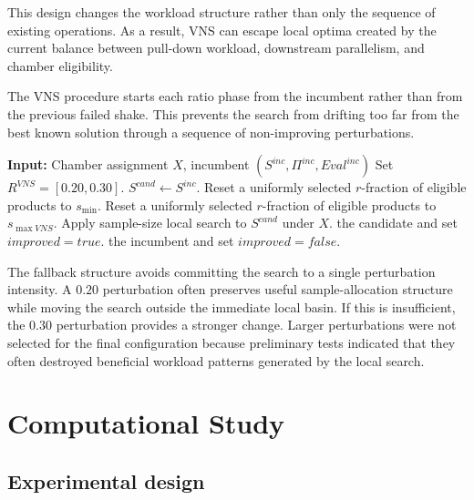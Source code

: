 \documentclass[11pt]{article}
\begin{document}
This design changes the workload structure rather than only the sequence of existing operations. As a result, VNS can escape local optima created by the current balance between pull-down workload, downstream parallelism, and chamber eligibility.

The VNS procedure starts each ratio phase from the incumbent rather than from the previous failed shake. This prevents the search from drifting too far from the best known solution through a sequence of non-improving perturbations.

\begin{algorithm}[H]
\caption{VNS with fixed fallback ratios}
\label{alg:vns_short}
\begin{algorithmic}[1]
\State \textbf{Input:} Chamber assignment \(X\), incumbent \((S^{inc},\Pi^{inc},Eval^{inc})\)
\State Set \(R^{VNS}=[0.20,0.30]\).
        \State \(S^{cand}\leftarrow S^{inc}\).
            \State Reset a uniformly selected \(r\)-fraction of eligible products to \(s_{\min}\).
        \Else
            \State Reset a uniformly selected \(r\)-fraction of eligible products to \(s_{\max VNS}\).
        \EndIf
        \State Apply sample-size local search to \(S^{cand}\) under \(X\).
            \State \Return the candidate and set \(improved=true\).
        \EndIf
    \EndFor
\EndFor
\State \Return the incumbent and set \(improved=false\).
\end{algorithmic}
\end{algorithm}

The fallback structure avoids committing the search to a single perturbation intensity. A \(0.20\) perturbation often preserves useful sample-allocation structure while moving the search outside the immediate local basin. If this is insufficient, the \(0.30\) perturbation provides a stronger change. Larger perturbations were not selected for the final configuration because preliminary tests indicated that they often destroyed beneficial workload patterns generated by the local search.

\section{Computational Study}
\label{sec:computational_study}

\subsection{Experimental design}
\label{subsec:exp_design}
\end{document}
